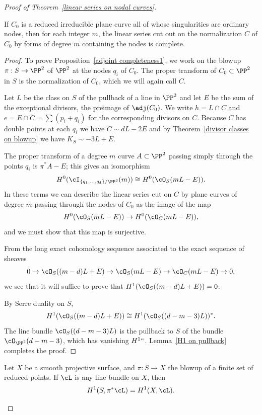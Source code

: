 \begin{proof}[Proof of Theorem~\ref{linear series on nodal curves}]
\begin{proposition}\label{adjoint completeness1}
If $C_{0}$ is a reduced irreducible plane curve all of whose singularities
are ordinary nodes, then for each
integer $m$,
the linear series cut out on the normalization $C$ of $C_{0}$ by forms
of degree $m$ containing the nodes
is complete.
\end{proposition}

\begin{proof}
To prove Proposition~\ref{adjoint completeness1}, we work on the blowup
$\pi : S \to \PP^2$ of $\PP^2$ at the nodes $q_i$ of $C_0$. The proper
transform of $C_0 \subset \PP^2$ in $S$ is the normalization of $C_0$,
%
which we will again call $C$.

Let $L$ be the class on $S$ of the pullback of a line in $\PP^2$
and let $E$ be the sum of the exceptional divisors, the preimage of
$\adj(C_{0})$. We write $h= L\cap C$ and $e = E\cap C= \sum (p_i+q_i)$
for the corresponding divisors on $C$.
Because $C$ has double points at each $q_{i}$ we have
$
C \sim dL - 2E
$
and   by
Theorem~\ref{divisor classes on blowup} we have $K_S \sim -3L + E$.

The proper transform of a degree $m$ curve $A\subset \PP^2$  passing
simply through the points $q_i$
is $\pi^*A - E$; this gives an isomorphism
$$
H^0(\cI_{\{q_1,\dots,q_\delta\}/\PP^2}(m)) \cong H^0(\cO_S(mL-E)).
$$
In these terms we can describe the linear series cut on $C$ by plane
curves of degree $m$ passing through the nodes of $C_0$ as the image of
the map
$$
H^0(\cO_S(mL-E)) \to H^0(\cO_C(mL-E)),
$$
and we must show that this map is surjective.

From the long exact cohomology sequence associated to the exact sequence
of sheaves
$$
0 \to \cO_S((m-d)L + E)  \to \cO_S(mL-E) \to \cO_C(mL-E) \to 0,
$$
 we see that it will suffice to prove that $H^1(\cO_S((m-d)L + E)) = 0$.

By Serre duality on $S$,
$$
H^1(\cO_S((m-d)L + E)) \cong H^1(\cO_S((d-m-3)L))^*.
$$
The line bundle $\cO_S((d-m-3)L)$ is
 the pullback to $S$ of the bundle $\cO_{\PP^2}(d-m-3)$, which has
 vanishing $H^1` `$. Lemma~\ref{H1 on pullback} completes the proof.
\end{proof}

\begin{lemma}\label{H1 on pullback}
Let $X$ be a smooth projective surface, and $\pi : S \to X$ the
%
blowup of
a finite set of reduced points. If $\cL$ is any line bundle on $X$, then
$$
H^1(S, \pi^*\cL) = H^1(X, \cL).
$$
\end{lemma}


\end{proof}
